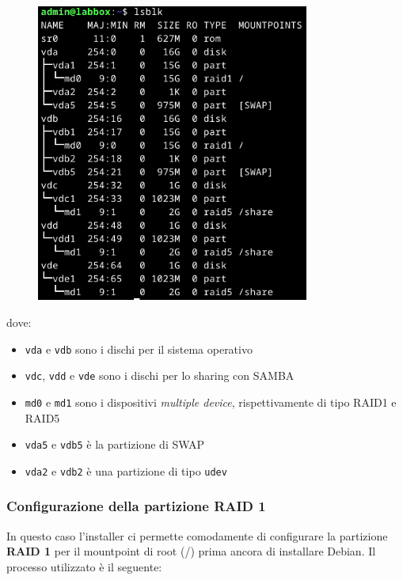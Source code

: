 \documentclass[11pt]{article}
\begin{document}
\begin{figure}[H]
    \includegraphics[width=0.8\textwidth, keepaspectratio]{../img/lsblk.png}
    \centering
\end{figure}

dove:
\begin{itemize}
    \item \texttt{vda} e \texttt{vdb} sono i dischi per il sistema operativo
    \item \texttt{vdc}, \texttt{vdd} e \texttt{vde} sono i dischi per lo sharing con SAMBA
    \item \texttt{md0} e \texttt{md1} sono i dispositivi \textit{multiple device}, rispettivamente di tipo RAID1 e RAID5
    \item \texttt{vda5} e \texttt{vdb5} è la partizione di SWAP
    \item \texttt{vda2} e \texttt{vdb2} è una partizione di tipo \texttt{udev}    
\end{itemize}

\pagebreak

\subsubsection{Configurazione della partizione RAID 1}
In questo caso l'installer ci permette comodamente di configurare la partizione \textbf{RAID 1} per il mountpoint di root (/) prima ancora di installare Debian. Il processo utilizzato è il seguente:
\end{document}
